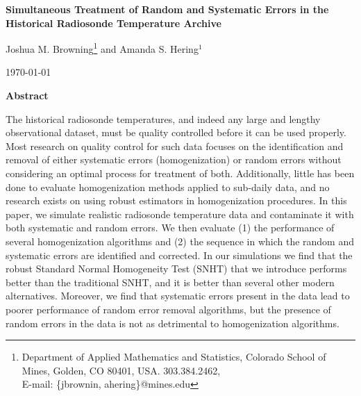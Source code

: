 \documentclass[12pt]{article}
\def\ni{\noindent}
\begin{document}
\thispagestyle{empty}
\baselineskip=28pt
\vskip 5mm
\begin{center} {\Large{\bf   Simultaneous Treatment of Random and Systematic Errors in the Historical Radiosonde Temperature Archive}}
\end{center}



\baselineskip=12pt
\vskip 5mm

\begin{center}\large
Joshua M. Browning\footnote{ \baselineskip=10pt
Department of Applied Mathematics and Statistics, Colorado School of Mines, Golden, CO 80401,
USA. 303.384.2462, \\E-mail: \{jbrownin, ahering\}@mines.edu} and Amanda S. Hering$^1$




\end{center}

\baselineskip=17pt
\vskip 5mm
\centerline{\today}
\vskip 5mm

\begin{center}
{\large{\bf Abstract}}
\end{center}

\baselineskip=14pt

\ni  The historical radiosonde temperatures, and indeed any large and lengthy observational dataset, must be quality controlled before it can be  used properly.   Most research on quality control for such data focuses on the identification and removal of either systematic errors (homogenization) or random errors without considering an optimal process for treatment of both.  Additionally, little has been done to evaluate  homogenization methods applied to sub-daily data, and no research exists on using robust estimators in homogenization procedures.  In this paper, we simulate realistic radiosonde temperature data and contaminate it with both systematic and random errors.  We then evaluate (1) the performance of several homogenization algorithms and (2) the sequence in which the random and systematic errors are identified and corrected.  In our simulations we find that the robust Standard Normal Homogeneity Test (SNHT) that we introduce performs better than the traditional SNHT, and it is better than several other modern alternatives.  Moreover, we find that systematic errors present in the data lead to poorer performance of random error removal algorithms, but the presence of random errors in the data is not as detrimental to homogenization algorithms.
\end{document}
